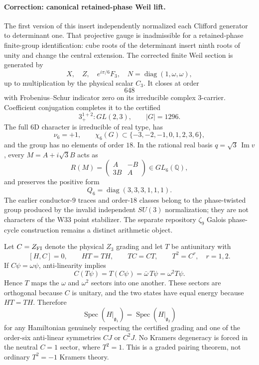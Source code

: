 \paragraph{Correction: canonical retained-phase Weil lift.}
The first version of this insert independently normalized each Clifford generator
to determinant one. That projective gauge is inadmissible for a retained-phase
finite-group identification: cube roots of the determinant insert ninth roots
of unity and change the central extension. The corrected finite Weil section is
generated by
\[
 X,\quad Z,\quad e^{i\pi/6}F_3,\quad
 N=\operatorname{diag}(1,\omega,\omega),
\]
up to multiplication by the physical scalar $C_3$. It closes at order
\[
\boxed{648}
\]
with Frobenius--Schur indicator zero on its irreducible complex $3$-carrier.
Coefficient conjugation completes it to the certified
\[
\boxed{3_+^{1+2}:GL(2,3),\qquad |G|=1296.}
\]
The full $6$D character is irreducible of real type, has
\[
\boxed{\nu_6=+1},
\qquad
\boxed{\chi_6(G)\subset\{-3,-2,-1,0,1,2,3,6\}},
\]
and the group has no elements of order $18$. In the rational real basis
$q=\sqrt3\,\operatorname{Im}v$, every $M=A+i\sqrt3 B$ acts as
\[
\boxed{
R(M)=\begin{pmatrix}A&-B\\3B&A\end{pmatrix}\in GL_6(\mathbb Q),
}
\]
and preserves the positive form
\[
\boxed{Q_6=\operatorname{diag}(3,3,3,1,1,1).}
\]
The earlier conductor-$9$ traces and order-$18$ classes belong to the
phase-twisted group produced by the invalid independent $SU(3)$ normalization;
they are not characters of the W33 point stabilizer. The separate repository
$\zeta_9$ Galois phase-cycle construction remains a distinct arithmetic object.

Let $C=Z_{\rm FI}$ denote the physical $Z_3$ grading and let $T$ be
antiunitary with
\[
[H,C]=0,\qquad HT=TH,\qquad TC=CT,\qquad T^2=C^r,\quad r=1,2.
\]
If $C\psi=\omega\psi$, anti-linearity implies
\[
C(T\psi)=T(C\psi)=\bar\omega\,T\psi=\omega^2T\psi.
\]
Hence $T$ maps the $\omega$ and $\omega^2$ sectors into one another.  These
sectors are orthogonal because $C$ is unitary, and the two states have equal
energy because $HT=TH$.  Therefore
\[
\boxed{
\operatorname{Spec}(H|_{\mathfrak g_1})
=
\operatorname{Spec}(H|_{\mathfrak g_2})
}
\]
for any Hamiltonian genuinely respecting the certified grading and one of the
order-six anti-linear symmetries $CJ$ or $C^2J$.  No Kramers degeneracy is
forced in the neutral $C=1$ sector, where $T^2=1$.  This is a graded pairing
theorem, not ordinary $T^2=-1$ Kramers theory.

